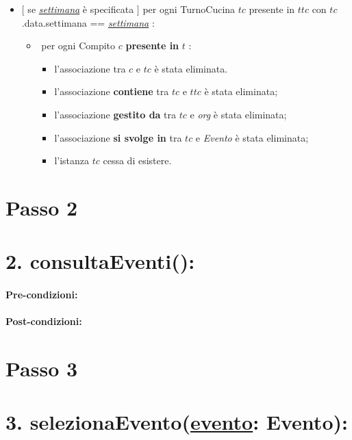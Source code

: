 \begin{itemize}
   \item $[$ se \underline{\textit{settimana}} è specificata $]$ \textlangle per ogni TurnoCucina $tc$ presente in $ttc$ con $tc$.data.settimana == \underline{\textit{settimana}} \textrangle:
\begin{itemize}
   \item \textlangle $ $ per ogni Compito $c$ \textbf{presente in} $t$ \textrangle:
    \begin{itemize}
        \item l'associazione tra $c$ e $tc$ è stata eliminata.
    \item l'associazione \textbf{contiene} tra $tc$ e $ttc$ è stata eliminata;
    \item l'associazione \textbf{gestito da} tra $tc$ e \textit{org} è stata eliminata;
\item l'associazione \textbf{si svolge in} tra $tc$ e \textit{Evento} è stata eliminata;
    \item l'istanza $tc$ cessa di esistere.
    \end{itemize}
\end{itemize}

\end{itemize}

\section{Passo 2}
\section*{2. consultaEventi():}

\paragraph{Pre-condizioni:}

\paragraph{Post-condizioni:}


\section{Passo 3}
\section*{3. selezionaEvento(\underline{evento}: Evento):}

